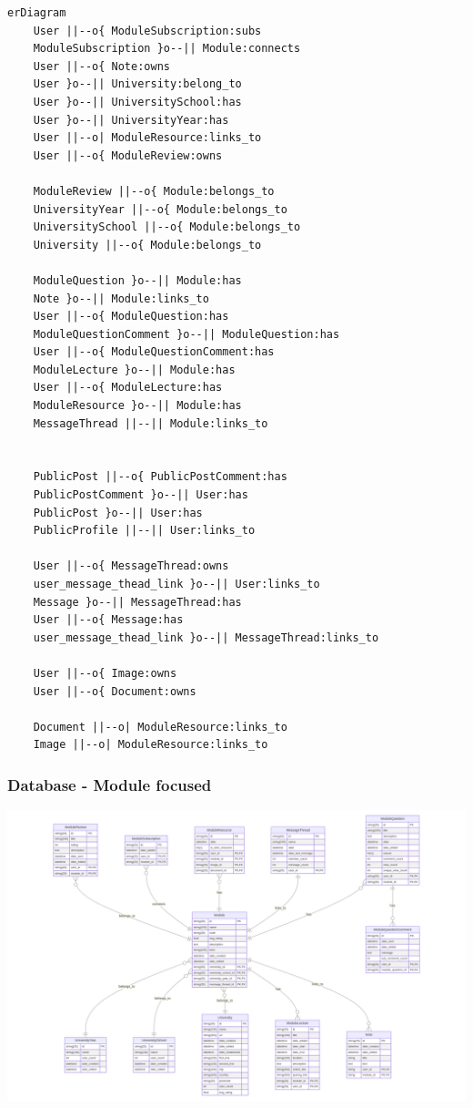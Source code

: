 \begin{lstlisting}
erDiagram
    User ||--o{ ModuleSubscription:subs
    ModuleSubscription }o--|| Module:connects
    User ||--o{ Note:owns
    User }o--|| University:belong_to
    User }o--|| UniversitySchool:has
    User }o--|| UniversityYear:has
    User ||--o| ModuleResource:links_to
    User ||--o{ ModuleReview:owns
    
    ModuleReview ||--o{ Module:belongs_to
    UniversityYear ||--o{ Module:belongs_to
    UniversitySchool ||--o{ Module:belongs_to
    University ||--o{ Module:belongs_to

    ModuleQuestion }o--|| Module:has
    Note }o--|| Module:links_to
    User ||--o{ ModuleQuestion:has
    ModuleQuestionComment }o--|| ModuleQuestion:has
    User ||--o{ ModuleQuestionComment:has
    ModuleLecture }o--|| Module:has
    User ||--o{ ModuleLecture:has
    ModuleResource }o--|| Module:has
    MessageThread ||--|| Module:links_to


    PublicPost ||--o{ PublicPostComment:has
    PublicPostComment }o--|| User:has
    PublicPost }o--|| User:has
    PublicProfile ||--|| User:links_to

    User ||--o{ MessageThread:owns
    user_message_thead_link }o--|| User:links_to
    Message }o--|| MessageThread:has
    User ||--o{ Message:has
    user_message_thead_link }o--|| MessageThread:links_to

    User ||--o{ Image:owns
    User ||--o{ Document:owns

    Document ||--o| ModuleResource:links_to
    Image ||--o| ModuleResource:links_to    
\end{lstlisting}

\subsubsection{Database - Module focused}

\includegraphics[scale=0.58, angle=90]{images/database/db_module.png}

